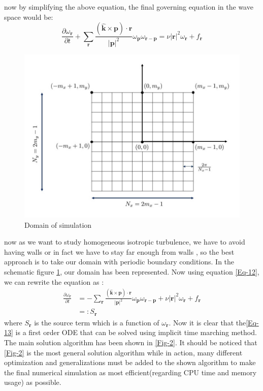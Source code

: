 \documentclass[10pt]{article}
\begin{document}
%
now by simplifying the above equation, the final governing equation in the wave space would be:
%
\begin{equation}\label{Eq-12}
\frac{\partial\omega_{\bm{r}}}{\partial t} + \sum_{\bm{r}}{\frac{(\bm{\hat{k}}\times\bm{p})\cdot\bm{r}}{|\bm{p}|^2}\omega_{\bm{p}}\omega_{\bm{r}-\bm{p}}}= \nu{|\bm{r}|}^2\omega_{\bm{r}} + f_{\bm{r}}
\end{equation}
%
\begin{figure}
\centering
\includegraphics[scale=0.5]{domain}
\caption{Domain of simulation}\label{Fig-1}
\end{figure}
%
now as we want to study homogeneous isotropic turbulence, we have to avoid having walls or in fact we have to stay far enough from walls , so the best approach is to take our domain with periodic boundary conditions. In the schematic figure \ref{Fig-1}, our domain has been represented. Now using equation \eqref{Eq-12}, we can rewrite the equation as :
%
\begin{align}
\frac{\partial\omega_{\bm{r}}}{\partial t} &= -\sum_{\bm{r}}{\frac{(\bm{\hat{k}}\times\bm{p})\cdot\bm{r}}{|\bm{p}|^2}\omega_{\bm{p}}\omega_{\bm{r}-\bm{p}}}+\nu{|\bm{r}|}^2\omega_{\bm{r}} + f_{\bm{r}} \tag*{} \\
&=: S_{\bm{r}}\label{Eq-13}
\end{align}
%
where $S_{\bm{r}}$ is the source term which is a function of $\omega_{\bm{r}}$. Now it is clear that the\eqref{Eq-13} is a first order ODE that can be solved using implicit time marching method. The main solution algorithm has been shown in \ref{Fig-2}. It should be noticed that \ref{Fig-2} is the most general solution algorithm while in action, many different optimization and generalizations must be added to the shown algorithm to make the final numerical simulation as most efficient(regarding CPU time and memory usage) as possible.
\end{document}
